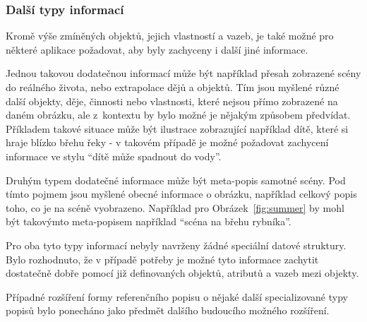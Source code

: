 \subsubsection{Další typy informací}
Kromě výše zmíněných objektů, jejich vlastností a vazeb, je také možné pro některé aplikace požadovat,
aby byly zachyceny i další jiné informace.

Jednou takovou dodatečnou informací může být například přesah zobrazené scény do reálného života, nebo extrapolace dějů a objektů.
Tím jsou myšlené různé další objekty, děje, činnosti nebo vlastnosti, které nejsou
přímo zobrazené na daném obrázku, ale z~kontextu by bylo možné je nějakým způsobem předvídat.
Příkladem takové situace může být ilustrace zobrazující například dítě, které si hraje blízko břehu řeky - v takovém případě je možné
požadovat zachycení informace ve stylu \enquote{dítě může spadnout do vody}.

Druhým typem dodatečné informace může být meta-popis samotné scény.
Pod tímto pojmem jsou myšlené obecné informace o obrázku, například celkový popis toho, co je na scéně vyobrazeno.
Například pro Obrázek~\ref{fig:summer} by mohl být takovýmto meta-popisem například \enquote{scéna na břehu rybníka}.

Pro oba tyto typy informací nebyly navrženy žádné speciální datové struktury.
Bylo rozhodnuto, že v případě potřeby je možné tyto informace zachytit dostatečně dobře pomocí již definovaných
objektů, atributů a vazeb mezi objekty.

Případné rozšíření formy referenčního popisu o nějaké další specializované typy popisů bylo ponecháno jako předmět dalšího budoucího možného rozšíření.
